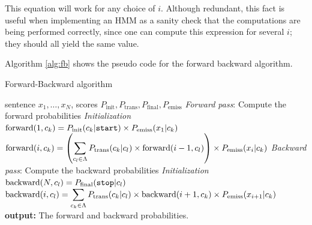 This equation will work for any choice of $i$. Although redundant, this fact is useful when implementing an
HMM as a sanity check that the computations are being performed
correctly, since one can compute this expression for several $i$; they should all yield the same value. 

Algorithm \ref{alg:fb} shows the pseudo code for the forward backward algorithm.



\begin{algorithm}[t]
   \caption{Forward-Backward algorithm \label{alg:fb}}
\begin{algorithmic}[1]
    sentence $x_1,\ldots,x_N$, scores $P_{\mathrm{init}}, P_{\mathrm{trans}}, P_{\mathrm{final}}, P_{\mathrm{emiss}}$
        \STATE  \emph{Forward pass}: Compute the forward probabilities
        \STATE \emph{Initialization}
        \STATE $\mathrm{forward}(1,c_k) = P_{\mathrm{init}}(c_k|\text{\tt start}) \times 
P_{\mathrm{emiss}}(x_1 | c_k)$
        \ENDFOR 
                 \STATE $\mathrm{forward}(i, c_k) = \left( \displaystyle \sum_{c_l \in \Lambda} P_{\mathrm{trans}}(c_k | c_l) \times \mathrm{forward}(i-1, c_l) \right) \times P_{\mathrm{emiss}}(x_i | c_k)$
         \ENDFOR 
        \ENDFOR 
       \STATE \emph{Backward pass}: Compute the backward probabilities
       \STATE \emph{Initialization}
        \STATE $\mathrm{backward}(N, c_l) = P_{\mathrm{final}}(\text{\tt stop} | c_l)$
        \ENDFOR 
        \STATE $\mathrm{backward}(i, c_l) =  \displaystyle \sum_{c_k \in \Lambda} P_{\mathrm{trans}}(c_k | c_l) \times \mathrm{backward}(i+1, c_k) \times P_{\mathrm{emiss}}(x_{i+1} | c_k)$
        \ENDFOR 
       \STATE \textbf{output:} The forward and backward probabilities.
\end{algorithmic}
\end{algorithm}





